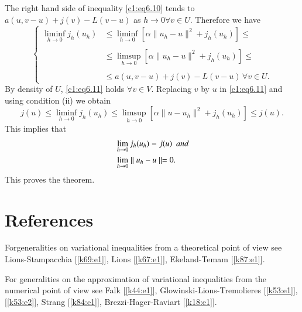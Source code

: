The right hand side of inequality \eqref{c1:eq6.10} tends to $a(u,
v-u)+j(v) - L(v-u)$ as $h \to 0 \forall v \in U$. Therefore we have  
\begin{equation}
\begin{cases}
\mathop{\lim\inf}_{h \to 0} j_h(u_h) & \leq \mathop{\lim\inf}_{h
\to 0} [\alpha \parallel u_h-u \parallel^2 + j_h(u_h)]
\leq \\ 
&\\
& \leq \mathop{\lim\sup}_{h \to 0} [\alpha \parallel u_h-u
  \parallel^2 + j_h(u_h)] \leq \\ 
&\\ 
& \leq a(u,v-u) +j(v)-L(v-u)\, \forall v \in U.
\end{cases}\tag{6.11}\label{c1:eq6.11}
\end{equation}
By density of $U$, \eqref{c1:eq6.11} holds $\forall v \in V$. Replacing $v$
by $u$ in \eqref{c1:eq6.11} and using condition (ii) we obtain 
$$
j(u) \leq \mathop{\lim\inf}_{h \to 0} j_h(u_h) \leq 
\mathop{\lim\sup}_{h \to 0} [\alpha \parallel u-u_h \parallel^2 +
  j_h(u_h)] \leq j(u). 
$$
This implies that
\begin{align*}
&\lim _{h \to 0} j_h(u_h) = j(u)~~ \text{\em and}\\
&\lim_{h \to 0} \parallel u_h-u \parallel = 0.
\end{align*}
This proves the theorem.

\section{References}\label{c1:s7}%

For\pageoriginale generalities on variational inequalities from a
theoretical point 
of view see Lions-Stampacchia [\ref{k69:e1}], Lions [\ref{k67:e1}],
Ekeland-Temam [\ref{k87:e1}].  

For generalities on the approximation of variational inequalities
{\small from}
the numerical point of view see Falk [\ref{k44:e1}],
Glowinski-Lions-Tremolieres 
[\ref{k53:e1}], [\ref{k53:e2}], Strang [\ref{k84:e1}],
Brezzi-Hager-Raviart [\ref{k18:e1}].  
